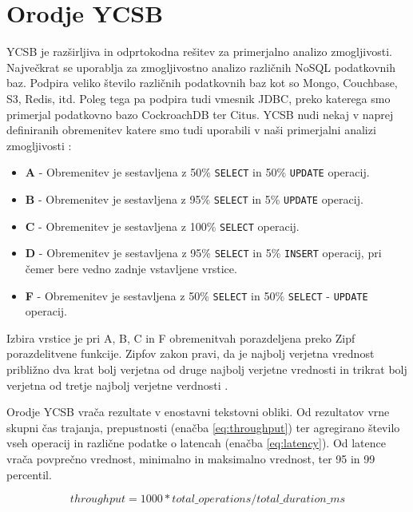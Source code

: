 \documentclass[a4paper, 12pt]{book}
\begin{document}
\section{Orodje YCSB}
\label{YCSB_about}
YCSB \cite{brianfrankcooper/YCSB} je razširljiva in odprtokodna rešitev za primerjalno analizo zmogljivosti. Največkrat se uporablja za zmogljivostno analizo različnih NoSQL podatkovnih baz. Podpira veliko število različnih podatkovnih baz kot so  Mongo, Couchbase, S3, Redis, itd. Poleg tega pa podpira tudi vmesnik JDBC, preko katerega smo primerjal podatkovno bazo CockroachDB ter Citus. YCSB nudi nekaj v naprej definiranih obremenitev katere smo tudi uporabili v naši primerjalni analizi zmogljivosti \cite{YCSB-core-workloads}:
\begin{itemize}
    \item \textbf{A} - Obremenitev je sestavljena z 50\% \texttt{SELECT} in 50\% \texttt{UPDATE} operacij.
    \item \textbf{B} - Obremenitev je sestavljena z 95\% \texttt{SELECT} in 5\% \texttt{UPDATE} operacij.
    \item \textbf{C} - Obremenitev je sestavljena z 100\% \texttt{SELECT} operacij.
    \item \textbf{D} - Obremenitev je sestavljena z 95\% \texttt{SELECT} in 5\% \texttt{INSERT} operacij, pri čemer bere vedno zadnje vstavljene vrstice.
    \item \textbf{F} - Obremenitev je sestavljena z 50\% \texttt{SELECT} in 50\% \texttt{SELECT} - \texttt{UPDATE} operacij.
\end{itemize}

Izbira vrstice je pri A, B, C in F obremenitvah porazdeljena preko Zipf porazdelitvene funkcije. Zipfov zakon pravi, da je najbolj verjetna vrednost približno dva krat bolj verjetna od druge najbolj verjetne vrednosti in trikrat bolj verjetna od tretje najbolj verjetne verdnosti \cite{zipfs-law}.

Orodje YCSB vrača rezultate v enostavni tekstovni obliki. Od rezultatov vrne skupni čas trajanja, prepustnosti (enačba \ref{eq:throughput}) ter agregirano število vseh operacij in različne podatke o latencah (enačba \ref{eq:latency}). Od latence vrača povprečno vrednost, minimalno in maksimalno vrednost, ter 95 in 99 percentil.

\begin{equation} \label{eq:throughput}
throughput = 1000 * total\_operations / total\_duration\_ms
\end{equation}
\end{document}
